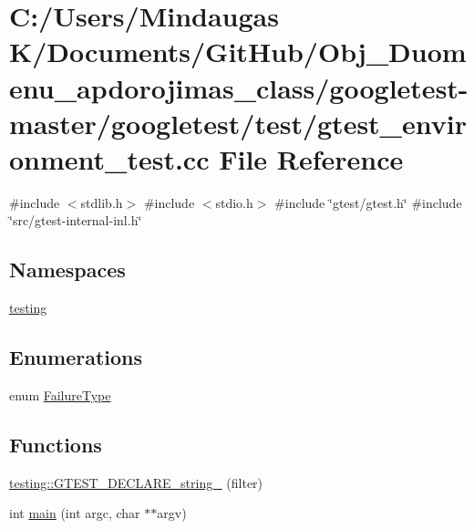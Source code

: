 \hypertarget{googletest-master_2googletest_2test_2gtest__environment__test_8cc}{}\section{C\+:/\+Users/\+Mindaugas K/\+Documents/\+Git\+Hub/\+Obj\+\_\+\+Duomenu\+\_\+apdorojimas\+\_\+class/googletest-\/master/googletest/test/gtest\+\_\+environment\+\_\+test.cc File Reference}
\label{googletest-master_2googletest_2test_2gtest__environment__test_8cc}
{\ttfamily \#include $<$stdlib.\+h$>$}\newline
{\ttfamily \#include $<$stdio.\+h$>$}\newline
{\ttfamily \#include \char`\"{}gtest/gtest.\+h\char`\"{}}\newline
{\ttfamily \#include \char`\"{}src/gtest-\/internal-\/inl.\+h\char`\"{}}\newline
\subsection*{Namespaces}
\begin{DoxyCompactItemize}
\item 
 \mbox{\hyperlink{namespacetesting}{testing}}
\end{DoxyCompactItemize}
\subsection*{Enumerations}
\begin{DoxyCompactItemize}
\item 
enum \mbox{\hyperlink{googletest-master_2googletest_2test_2gtest__environment__test_8cc_aa43ad7e2c1c5c5150ba8d95607a96263}{Failure\+Type}} 
\end{DoxyCompactItemize}
\subsection*{Functions}
\begin{DoxyCompactItemize}
\item 
\mbox{\hyperlink{namespacetesting_a20d69860ce843142c7f740262e6b0c9a}{testing\+::\+G\+T\+E\+S\+T\+\_\+\+D\+E\+C\+L\+A\+R\+E\+\_\+string\+\_\+}} (filter)
\item 
int \mbox{\hyperlink{googletest-master_2googletest_2test_2gtest__environment__test_8cc_a3c04138a5bfe5d72780bb7e82a18e627}{main}} (int argc, char $\ast$$\ast$argv)
\end{DoxyCompactItemize}


